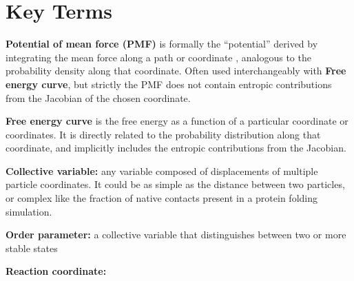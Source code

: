 
\section{Key Terms}

\begin{descripion}

  \item \textbf{Potential of mean force (PMF)} is formally the ``potential'' derived by integrating the mean force along a path or coordinate \cite{Kirkwood-1935}, analogous to the probability density along that coordinate.  Often used interchangeably with \textbf{Free energy curve}, but strictly the PMF does not contain entropic contributions from the Jacobian of the chosen coordinate.

  \item \textbf{Free energy curve} is the free energy as a function of a
  particular coordinate or coordinates.  It is directly related to the
  probability distribution along that coordinate, and implicitly includes the
  entropic contributions from the Jacobian.


  \item \textbf{Collective variable:} any variable composed of displacements of
  multiple particle coordinates.  It could be as simple as the distance between
  two particles, or complex like the fraction of native contacts present in a
  protein folding simulation.

  \item \textbf{Order parameter:}  a collective variable that distinguishes between two or more stable states

  \item \textbf{Reaction coordinate:} 

\end{descripion}
